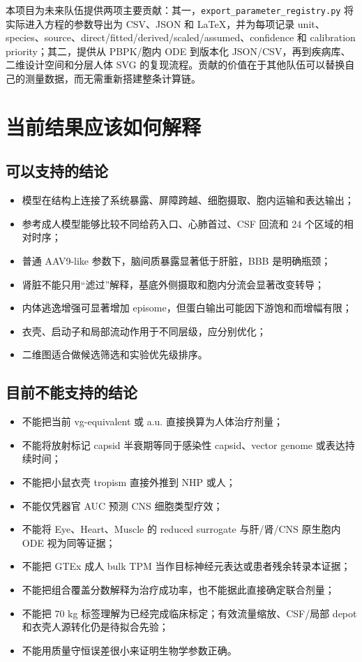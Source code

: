 \documentclass[UTF8,11pt,a4paper]{ctexart}
\newcommand{\code}[1]{\texttt{#1}}
\begin{document}
本项目为未来队伍提供两项主要贡献：其一，\code{export\_parameter\_registry.py} 将实际进入方程的参数导出为 CSV、JSON 和 LaTeX，并为每项记录 unit、species、source、direct/fitted/derived/scaled/assumed、confidence 和 calibration priority；其二，提供从 PBPK/胞内 ODE 到版本化 JSON/CSV，再到疾病库、二维设计空间和分层人体 SVG 的复现流程。贡献的价值在于其他队伍可以替换自己的测量数据，而无需重新搭建整条计算链。

\section{当前结果应该如何解释}

\subsection{可以支持的结论}
\begin{itemize}
  \item 模型在结构上连接了系统暴露、屏障跨越、细胞摄取、胞内运输和表达输出；
  \item 参考成人模型能够比较不同给药入口、心肺首过、CSF 回流和 24 个区域的相对时序；
  \item 普通 AAV9-like 参数下，脑间质暴露显著低于肝脏，BBB 是明确瓶颈；
  \item 肾脏不能只用“滤过”解释，基底外侧摄取和胞内分流会显著改变转导；
  \item 内体逃逸增强可显著增加 episome，但蛋白输出可能因下游饱和而增幅有限；
  \item 衣壳、启动子和局部流动作用于不同层级，应分别优化；
  \item 二维图适合做候选筛选和实验优先级排序。
\end{itemize}

\subsection{目前不能支持的结论}
\begin{itemize}
  \item 不能把当前 vg-equivalent 或 a.u. 直接换算为人体治疗剂量；
  \item 不能将放射标记 capsid 半衰期等同于感染性 capsid、vector genome 或表达持续时间；
  \item 不能把小鼠衣壳 tropism 直接外推到 NHP 或人；
  \item 不能仅凭器官 AUC 预测 CNS 细胞类型疗效；
  \item 不能将 Eye、Heart、Muscle 的 reduced surrogate 与肝/肾/CNS 原生胞内 ODE 视为同等证据；
  \item 不能把 GTEx 成人 bulk TPM 当作目标神经元表达或患者残余转录本证据；
  \item 不能把组合覆盖分数解释为治疗成功率，也不能据此直接确定联合剂量；
  \item 不能把 70 kg 标签理解为已经完成临床标定；有效流量缩放、CSF/局部 depot 和衣壳人源转化仍是待拟合先验；
  \item 不能用质量守恒误差很小来证明生物学参数正确。
\end{itemize}
\end{document}
